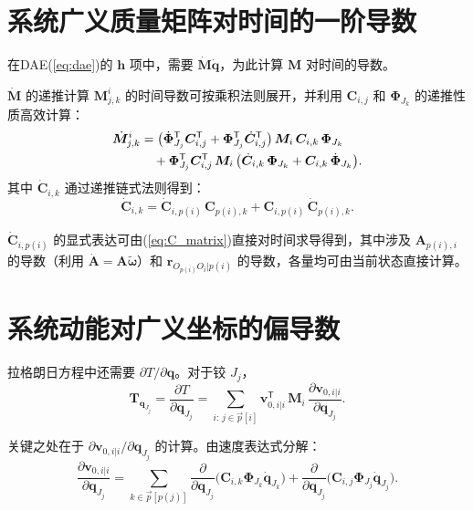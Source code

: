 \documentclass[10pt,a4paper]{book}
\theoremstyle{thmstyle}
\theoremstyle{defstyle}
\theoremstyle{prostyle}
\newcommand{\ppb}[1]{{\!p(#1)}}
\newcommand{\T}{^{\mathsf{T}}}
\renewcommand{\vec}[1]{\bm{#1}}
\newcommand{\mat}[1]{\bm{#1}}
\begin{document}
\section{系统广义质量矩阵对时间的一阶导数}

在DAE(\ref{eq:dae})的 $\vec{h}$ 项中，需要 $\dot{\mat{M}}\dot{\vec{q}}$，为此计算 $\mat{M}$ 对时间的导数。

\begin{myTheorem}{$\dot{\mat{M}}$ 的递推计算}
$\mat{M}_{j,k}^{i}$ 的时间导数可按乘积法则展开，并利用 $\mat{C}_{i,j}$ 和 $\mat{\Phi}_{J_k}$ 的递推性质高效计算：
\begin{align}
\dot{\mat{M}}_{j,k}^{i}
&= \bigl(\dot{\mat{\Phi}}_{J_j}\T\mat{C}_{i,j}\T + \mat{\Phi}_{J_j}\T\dot{\mat{C}}_{i,j}\T\bigr)
\,\mat{M}_i\,\mat{C}_{i,k}\,\mat{\Phi}_{J_k} \notag\\
&\quad + \mat{\Phi}_{J_j}\T\mat{C}_{i,j}\T\,\mat{M}_i\,
\bigl(\dot{\mat{C}}_{i,k}\,\mat{\Phi}_{J_k} + \mat{C}_{i,k}\,\dot{\mat{\Phi}}_{J_k}\bigr).
\label{eq:Mdot}
\end{align}
其中 $\dot{\mat{C}}_{i,k}$ 通过递推链式法则得到：
\begin{equation}
\dot{\mat{C}}_{i,k}
= \dot{\mat{C}}_{i,p(i)}\,\mat{C}_{p(i),k} + \mat{C}_{i,p(i)}\,\dot{\mat{C}}_{p(i),k}.
\label{eq:Cdot_recur}
\end{equation}
\end{myTheorem}

$\dot{\mat{C}}_{i,p(i)}$ 的显式表达可由(\ref{eq:C_matrix})直接对时间求导得到，其中涉及 $\mat{A}_{p(i),i}$ 的导数（利用 $\dot{\mat{A}} = \mat{A}\widetilde{\vec{\omega}}$）和 $\vec{r}_{O_{p(i)}O_i|p(i)}$ 的导数，各量均可由当前状态直接计算。


\section{系统动能对广义坐标的偏导数}

拉格朗日方程中还需要 $\partial T/\partial \vec{q}$。对于铰 $J_j$，
\begin{equation}
\mat{T}_{\vec{q}_{J_j}}
= \frac{\partial T}{\partial\vec{q}_{J_j}}
= \sum_{i:\,j\in\overrightarrow{p}[i]} \vec{v}_{0,i|i}\T\,\mat{M}_i\,\frac{\partial\vec{v}_{0,i|i}}{\partial\vec{q}_{J_j}}.
\label{eq:Tqj}
\end{equation}

关键之处在于 $\partial\vec{v}_{0,i|i}/\partial\vec{q}_{J_j}$ 的计算。由速度表达式分解：
\begin{equation}
\frac{\partial\vec{v}_{0,i|i}}{\partial\vec{q}_{J_j}}
= \sum_{k\in\overrightarrow{p}[\ppb{j}]}
\frac{\partial}{\partial\vec{q}_{J_j}}\bigl(\mat{C}_{i,k}\mat{\Phi}_{J_k}\dot{\vec{q}}_{J_k}\bigr)
+ \frac{\partial}{\partial\vec{q}_{J_j}}\bigl(\mat{C}_{i,j}\mat{\Phi}_{J_j}\dot{\vec{q}}_{J_j}\bigr).
\label{eq:dvdq}
\end{equation}
\end{document}
